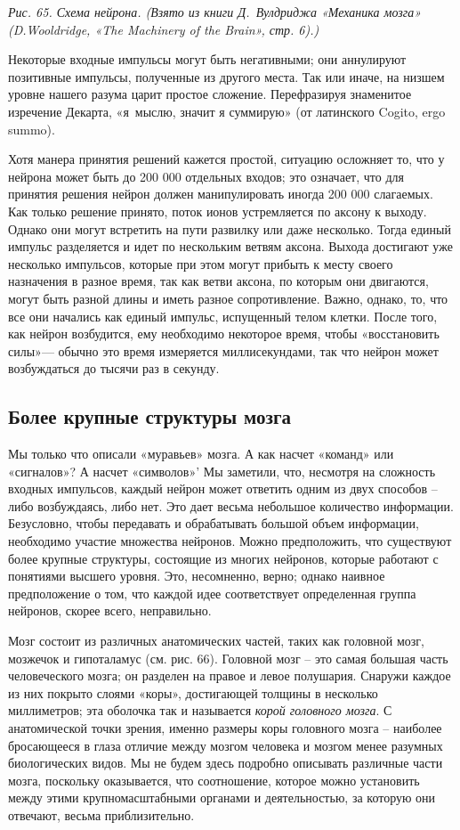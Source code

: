 \documentclass[../main.tex]{subfiles}
\begin{document}
\emph{Рис. 65. Схема нейрона. (Взято из книги Д.~Вулдриджа «Механика мозга» (D.Wooldridge, «The Machinery of the Brain», стр. 6).)}

Некоторые входные импульсы могут быть негативными; они аннулируют позитивные импульсы, полученные из другого места. Так или иначе, на низшем уровне нашего разума царит простое сложение. Перефразируя знаменитое изречение Декарта, «я~мыслю, значит я суммирую» (от латинского Cogito, ergo summo).

Хотя манера принятия решений кажется простой, ситуацию осложняет то, что у нейрона может быть до 200 000 отдельных входов; это означает, что для принятия решения нейрон должен манипулировать иногда 200 000 слагаемых. Как только решение принято, поток ионов устремляется по аксону к выходу. Однако они могут встретить на пути развилку или даже несколько. Тогда единый импульс разделяется и идет по нескольким ветвям аксона. Выхода достигают уже несколько импульсов, которые при этом могут прибыть к месту своего назначения в разное время, так как ветви аксона, по которым они двигаются, могут быть разной длины и иметь разное сопротивление. Важно, однако, то, что все они начались как единый импульс, испущенный телом клетки. После того, как нейрон возбудится, ему необходимо некоторое время, чтобы «восстановить силы»--- обычно это время измеряется миллисекундами, так что нейрон может возбуждаться до тысячи раз в секунду.


\subsection{Более крупные структуры мозга}

Мы только что описали «муравьев» мозга. А как насчет «команд» или «сигналов»? А насчет «символов»' Мы заметили, что, несмотря на сложность входных импульсов, каждый нейрон может ответить одним из двух способов \--- либо возбуждаясь, либо нет. Это дает весьма небольшое количество информации. Безусловно, чтобы передавать и обрабатывать большой объем информации, необходимо участие множества нейронов. Можно предположить, что существуют более крупные структуры, состоящие из многих нейронов, которые работают с понятиями высшего уровня. Это, несомненно, верно; однако наивное предположение о том, что каждой идее соответствует определенная группа нейронов, скорее всего, неправильно.

Мозг состоит из различных анатомических частей, таких как головной мозг, мозжечок и гипоталамус (см. рис. 66). Головной мозг \--- это самая большая часть человеческого мозга; он разделен на правое и левое полушария. Снаружи каждое из них покрыто слоями «коры», достигающей толщины в несколько миллиметров; эта оболочка так и называется \emph{корой головного мозга}. С анатомической точки зрения, именно размеры коры головного мозга \--- наиболее бросающееся в глаза отличие между мозгом человека и мозгом менее разумных биологических видов. Мы не будем здесь подробно описывать различные части мозга, поскольку оказывается, что соотношение, которое можно установить между этими крупномасштабными органами и деятельностью, за которую они отвечают, весьма приблизительно.
\end{document}
